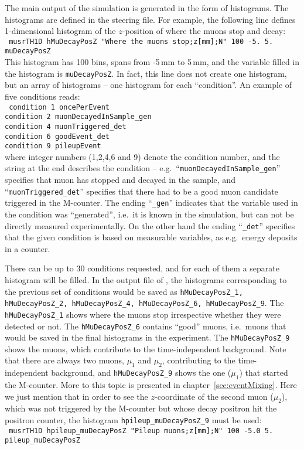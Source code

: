 \documentclass[twoside]{dis04}
\begin{document}
The main output of the simulation is generated in the form of histograms.
The histograms are defined in the steering file. For example, the following
line defines 1-dimensional histogram of the $z$-position of where the muons stop and decay:\\[1em]
{\tt
musrTH1D hMuDecayPosZ "Where the muons stop;z[mm];N" 100 -5. 5. muDecayPosZ
}\\[1em]
This histogram has 100 bins, spans from -5\,mm to 5\,mm, and the variable filled
in the histogram is {\tt muDecayPosZ}.
In fact, this line does not create one histogram, but an array of histograms -- one
histogram for each ``condition''.  An example of five conditions reads:\\[1em]
{\tt
condition 1 oncePerEvent \\
condition 2 muonDecayedInSample\_gen \\
condition 4 muonTriggered\_det \\
condition 6 goodEvent\_det \\
condition 9 pileupEvent 
}\\[1em]
where integer numbers (1,2,4,6 and 9) denote the condition number, and the string at the end
describes the condition -- e.g.\ ``{\tt muonDecayedInSample\_gen}'' specifies that muon
has stopped and decayed in the sample, and ``{\tt muonTriggered\_det}'' specifies that
there had to be a good muon candidate triggered in the M-counter.  
The ending ``{\tt \_gen}'' indicates that the variable used in the condition 
was ``generated'', i.e.\ it is known in the simulation, but can not be directly 
measured experimentally.
On the other hand the ending ``{\tt \_det}'' specifies that the given condition
is based on measurable variables, as e.g.\ energy deposits in a counter.

There can be up to
30 conditions requested, and for each of them a separate histogram will be filled.
In the output file of \musrSimAna, the histograms corresponding to the previous 
set of conditions would be saved as
{\tt hMuDecayPosZ\_1, hMuDecayPosZ\_2, hMuDecayPosZ\_4, hMuDecayPosZ\_6, hMuDecayPosZ\_9}.
The {\tt hMuDecayPosZ\_1} shows where the muons stop irrespective whether they were
detected or not. The {\tt hMuDecayPosZ\_6} contains ``good'' muons, i.e.\ muons that would
be saved in the final histograms in the experiment.  The  {\tt hMuDecayPosZ\_9} shows
the muons, which contribute to the time-independent background.  Note that there are always
two muons, $\mu_1$ and $\mu_2$, contributing to the time-independent background, and {\tt hMuDecayPosZ\_9}
shows the one ($\mu_1$) that started the M-counter. More to this topic is presented
in chapter~\ref{sec:eventMixing}. Here we just mention that in order 
to see the $z$-coordinate of the second muon ($\mu_2$),
which was not triggered by the M-counter but whose decay positron hit the positron counter,
the histogram {\tt hpileup\_muDecayPosZ\_9} must be used:\\[1em]
{\tt
musrTH1D hpileup\_muDecayPosZ "Pileup muons;z[mm];N" 100 -5.0 5. pileup\_muDecayPosZ
}
\end{document}
